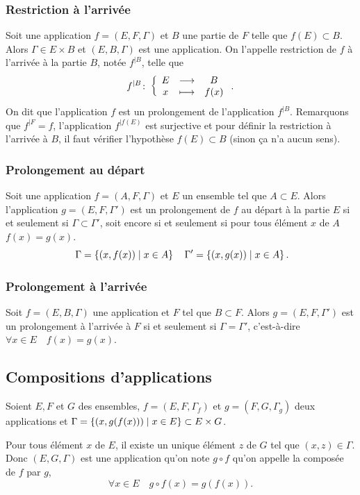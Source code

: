 \subsubsection{Restriction à l'arrivée}
\label{chap3-subsubsec:restrictionarr}
Soit une application $f=(E,F,\Gamma)$ et $B$ une partie de $F$ telle que $f(E) \subset B$. Alors $\Gamma \in E \times B$ et $(E,B,\Gamma)$ est une application. On l'appelle restriction de $f$ à l'arrivée à la partie $B$, notée $f^{|B}$, telle que
\begin{equation}
f^{|B}\colon \left\{\begin{array}{ccc} E & \longrightarrow &B\\ x & \longmapsto & f(x) \end{array} \right..
\end{equation}
On dit que l'application $f$ est un prolongement de l'application $f^{|B}$. Remarquons que \primo $f^{|F}=f$, \secundo l'application $f^{|f(E)}$ est surjective et \tertio pour définir la restriction à l'arrivée à $B$, il faut vérifier l'hypothèse $f(E) \subset B$ (sinon ça n'a aucun sens).

\subsubsection{Prolongement au départ}
\label{chap3-subsubsec:prolongementdep}
Soit une application $f=(A,F,\Gamma)$ et $E$ un ensemble tel que $A \subset E$. Alors l'application $g=(E,F,\Gamma')$ est un prolongement de $f$ au départ à la partie $E$ si et seulement si $\Gamma \subset \Gamma'$, soit encore si et seulement si pour tous élément $x$ de $A$ $f(x)=g(x)$.
\begin{equation}\
\Gamma=\left\{(x,f(x))\mathrel{}\middle|\mathrel{}x \in A\right\} \quad \Gamma'=\left\{(x,g(x))\mathrel{}\middle|\mathrel{}x \in A\right\}.
\end{equation}
\subsubsection{Prolongement à l'arrivée}
\label{chap3-subsubsec:prolongementarr}
Soit $f=(E,B,\Gamma)$ une application et $F$ tel que $B \subset F$. Alors $g=(E,F,\Gamma')$ est un prolongement à l'arrivée à $F$ si et seulement si $\Gamma = \Gamma'$, c'est-à-dire $\forall x \in E \quad f(x)=g(x)$.
%
\subsection{Compositions d'applications}
\label{chap3-subsec:compapp}
\begin{defdef}
  Soient $E,F$ et $G$ des ensembles, $f=(E,F,\Gamma_f)$ et $g=(F,G, \Gamma_g)$ deux applications et $\Gamma = \left\{(x,g(f(x)))\mathrel{}\middle|\mathrel{}x \in E\right\} \subset E \times G$.
\end{defdef}
Pour tous élément $x$ de $E$, il existe un unique élément $z$ de $G$ tel que $(x,z) \in \Gamma$. Donc $(E,G,\Gamma)$ est une application qu'on note $g \circ f$ qu'on appelle la composée de $f$ par $g$,
\begin{equation}
  \forall x \in E \quad g \circ f(x)=g(f(x)).
\end{equation}

